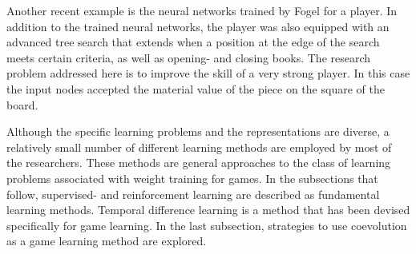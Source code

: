 Another recent example is the neural networks trained by Fogel \etal \cite{fogel:chess} for a  player.  In addition to the trained neural networks, the player was also equipped with an advanced tree search that extends when a position at the edge of the search meets certain criteria, as well as opening- and closing books.  The research problem addressed here is  to improve the skill of a very strong player.  In this case the input nodes accepted the material value of the piece on the square of the  board.

Although the specific learning problems and the representations are diverse, a relatively small number of different learning methods are employed by most of the researchers.  These methods are general approaches to the class of learning problems associated with weight training for games.  In the subsections that follow, supervised- and reinforcement learning are described as fundamental learning methods.  Temporal difference learning is a method that has been devised specifically for game learning.  In the last subsection, strategies to use coevolution as a game learning method are explored.

%

